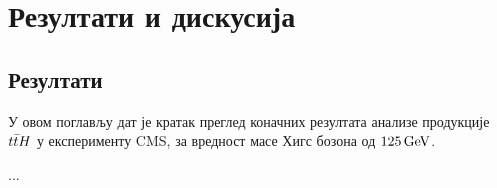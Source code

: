 
\chapter{Резултати и дискусија} %

\label{Резултати и дискусија} %


\section{Резултати}

У овом поглављу дат је кратак преглед коначних резултата анализе продукције $t\bar{t}H$ у експерименту CMS, за вредност масе Хигс бозона од $125\,\mathrm{GeV}$.

...
